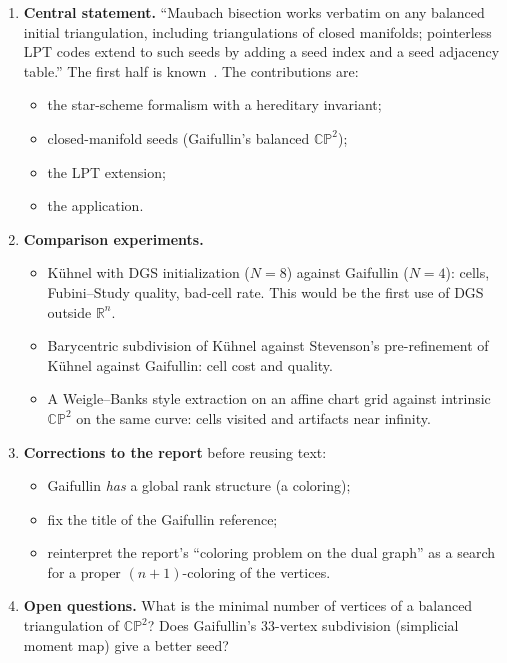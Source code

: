 \documentclass[11pt]{article}
\newcommand{\CP}{\mathbb{CP}}
\begin{document}
\begin{enumerate}[leftmargin=*,itemsep=3pt]
\item \textbf{Central statement.} ``Maubach bisection works verbatim on any
  balanced initial triangulation, including triangulations of closed
  manifolds; pointerless LPT codes extend to such seeds by adding a seed
  index and a seed adjacency table.'' The first half is known~\cite{traxler1997,dgs2025}.
  The contributions are:
  \begin{itemize}[itemsep=0pt]
  \item the star-scheme formalism with a hereditary invariant;
  \item closed-manifold seeds (Gaifullin's balanced $\CP^2$);
  \item the LPT extension;
  \item the application.
  \end{itemize}
\item \textbf{Comparison experiments.}
  \begin{itemize}[itemsep=0pt]
  \item Kühnel with DGS initialization ($N=8$) against Gaifullin ($N=4$):
    cells, Fubini--Study quality, bad-cell rate. This would be the first use
    of DGS outside $\mathbb R^n$.
  \item Barycentric subdivision of Kühnel against Stevenson's
    pre-refinement of Kühnel against Gaifullin: cell cost and quality.
  \item A Weigle--Banks style extraction on an affine chart grid against
    intrinsic $\CP^2$ on the same curve: cells visited and artifacts near
    infinity.
  \end{itemize}
\item \textbf{Corrections to the report} before reusing text:
  \begin{itemize}[itemsep=0pt]
  \item Gaifullin \emph{has} a global rank structure (a coloring);
  \item fix the title of the Gaifullin reference;
  \item reinterpret the report's ``coloring problem on the dual graph'' as a
    search for a proper $(n{+}1)$-coloring of the vertices.
  \end{itemize}
\item \textbf{Open questions.} What is the minimal number of vertices of a
  balanced triangulation of $\CP^2$? Does Gaifullin's 33-vertex subdivision
  (simplicial moment map) give a better seed?
\end{enumerate}



\end{document}
